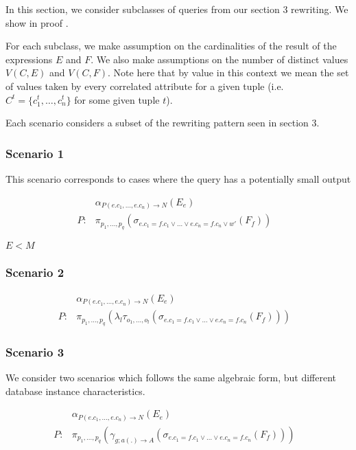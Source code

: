 In this section, we consider subclasses of queries from our section 3 rewriting. We show in proof 
.

For each subclass, we make assumption on the cardinalities of the result of the expressions $E$ and $F$. We also make assumptions on the number of distinct values $V(C,E)$ and $V(C,F)$. Note here that by value in this context we mean the set of values taken by every correlated attribute for a given tuple (i.e. $C^t = \{c_1^t, \dots, c_n^t\}$ for some given tuple $t$). 

Each scenario considers a subset of the rewriting pattern seen in section 3.

\subsubsection{Scenario 1}

This scenario corresponds to cases where the query has a potentially small output 

\begin{align}
& \alpha_{P(e.c_1, \dots, e.c_n) \rightarrow N}(E_e) \\
P : & \pi_{p_1,\dots,p_q}(\sigma_{e.c_1 = f.c_1 \vee \dots \vee e.c_n = f.c_n \vee w'}(F_f))& \nonumber
\end{align}

$E < M$

\subsubsection{Scenario 2}

\begin{align}
& \alpha_{P(e.c_1, \dots, e.c_n) \rightarrow N}(E_e) \\
P : & \pi_{p_1,\dots,p_q}(\lambda_l\tau_{o_1,\dots,o_l}(\sigma_{e.c_1 = f.c_1 \vee \dots \vee e.c_n = f.c_n}(F_f)))& \nonumber
\end{align}

\subsubsection{Scenario 3}

We consider two scenarios which follows the same algebraic form, but different database instance characteristics. 

\begin{align}
& \alpha_{P(e.c_1, \dots, e.c_n) \rightarrow N}(E_e) \\
P : & \pi_{p_1,\dots,p_q}(\gamma_{g;a(.) \rightarrow A}(\sigma_{e.c_1 = f.c_1 \vee \dots \vee e.c_n = f.c_n}(F_f)))& \nonumber
\end{align}

